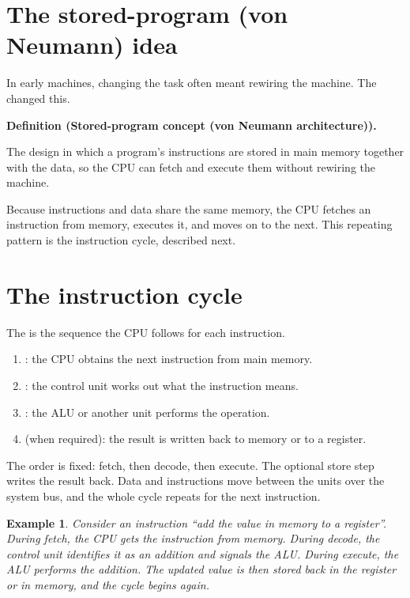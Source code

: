 \documentclass[11pt]{article}
\newtheorem{example}{Example}[section]
\newenvironment{definitionbox}[1]{%
  \par\noindent\textbf{Definition (#1).}\ \itshape
}{\par\vspace{0.3em}}
\begin{document}
\section{The stored-program (von Neumann) idea}
In early machines, changing the task often meant rewiring the machine. The
 changed this.

\begin{definitionbox}{Stored-program concept (von Neumann architecture)}
The design in which a program's instructions are stored in main memory
together with the data, so the CPU can fetch and execute them without
rewiring the machine.
\end{definitionbox}

Because instructions and data share the same memory, the CPU fetches an
instruction from memory, executes it, and moves on to the next. This repeating
pattern is the instruction cycle, described next.

\section{The instruction cycle}
The  is the sequence the CPU follows for each
instruction.

\begin{enumerate}
  \item {}: the CPU obtains the next instruction from main memory.
  \item {}: the control unit works out what the instruction means.
  \item {}: the ALU or another unit performs the operation.
  \item {} (when required): the result is written back to memory or
    to a register.
\end{enumerate}

The order is fixed: fetch, then decode, then execute. The optional store step
writes the result back. Data and instructions move between the units over the
system bus, and the whole cycle repeats for the next instruction.

\begin{example}
Consider an instruction ``add the value in memory to a register''. During
fetch, the CPU gets the instruction from memory. During decode, the control
unit identifies it as an addition and signals the ALU. During execute, the ALU
performs the addition. The updated value is then stored back in the register
or in memory, and the cycle begins again.
\end{example}
\end{document}
